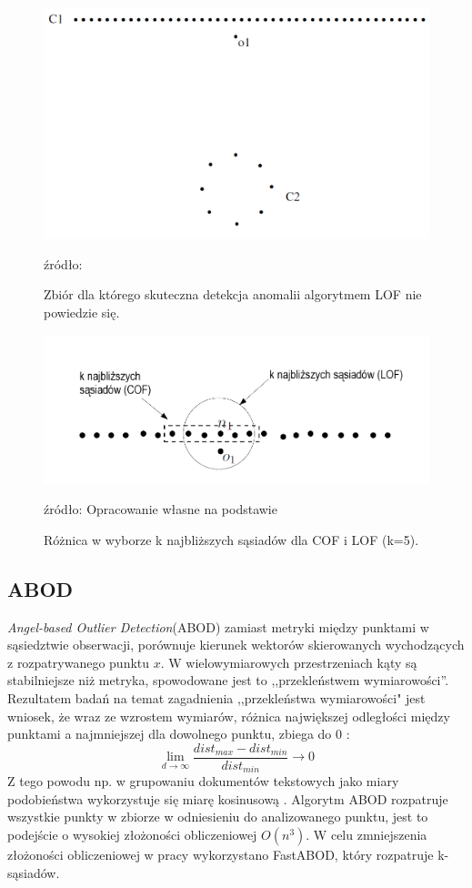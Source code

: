 \begin{figure}
    \centering
    \includegraphics[width=.7\textwidth]{chapters/MetaOD/images/cof.png}
    \caption{Zbiór dla którego skuteczna detekcja anomalii algorytmem LOF nie powiedzie się.}
    \footnotesize{źródło: \cite{cof}}
    \label{fig:cof}
\end{figure}

\begin{figure}
    \centering
    \includegraphics[width=.8\textwidth]{chapters/MetaOD/images/lvcof.png}
    \caption{Różnica w wyborze k najbliższych sąsiadów dla COF i LOF (k=5).}
    \footnotesize{źródło: Opracowanie własne na podstawie  \cite{chandola2009anomaly}}
    \label{fig:lcof}
\end{figure}

\subsection{ABOD}
\label{abod}
\textit{Angel-based Outlier Detection}(ABOD) \cite{abod} zamiast metryki między punktami w sąsiedztwie obserwacji, porównuje kierunek wektorów skierowanych wychodzących z rozpatrywanego punktu $x$.  W wielowymiarowych przestrzeniach kąty są stabilniejsze niż metryka, spowodowane jest to ,,przekleństwem wymiarowości''. Rezultatem badań na temat zagadnienia ,,przekleństwa wymiarowości"\cite{curse} jest wniosek, że wraz ze wzrostem wymiarów, różnica największej odległości między punktami a najmniejszej dla dowolnego punktu, zbiega do 0 :
\begin{equation}
\lim_{d\to\infty} \frac{dist_{max} - dist_{min}}{dist_{min}} \longrightarrow 0
\end{equation}
Z tego powodu np. w grupowaniu dokumentów tekstowych jako miary podobieństwa wykorzystuje się miarę kosinusową \cite{huang2008similarity}. Algorytm ABOD rozpatruje wszystkie punkty w zbiorze w odniesieniu do analizowanego punktu, jest to podejście o wysokiej złożoności obliczeniowej $O(n^3)$. W celu zmniejszenia złożoności obliczeniowej w pracy wykorzystano FastABOD, który rozpatruje k-sąsiadów.


